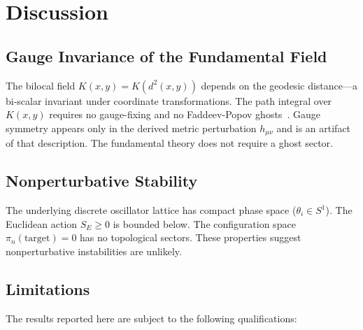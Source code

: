 \documentclass[aps,prd,reprint,nofootinbib]{revtex4-2}
\begin{document}
\section{Discussion}
\label{sec:discussion}

\subsection{Gauge Invariance of the Fundamental Field}

The bilocal field $K(x,y) = K(d^2(x,y))$ depends on the geodesic distance---a bi-scalar invariant under coordinate transformations. The path integral over $K(x,y)$ requires no gauge-fixing and no Faddeev-Popov ghosts~\cite{TRM_G6_Final}. Gauge symmetry appears only in the derived metric perturbation $h_{\mu\nu}$ and is an artifact of that description. The fundamental theory does not require a ghost sector.

\subsection{Nonperturbative Stability}

The underlying discrete oscillator lattice has compact phase space ($\theta_i \in S^1$). The Euclidean action $S_E \geq 0$ is bounded below. The configuration space $\pi_n(\text{target}) = 0$ has no topological sectors. These properties suggest nonperturbative instabilities are unlikely.

\subsection{Limitations}
\label{sec:limitations}

The results reported here are subject to the following qualifications:
\end{document}

